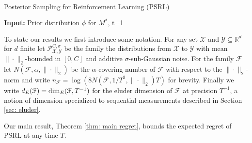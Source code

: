 \documentclass{article}
\newcommand{\Real}{\mathds{R}}
\newcommand{\Xc}{\mathcal{X}}
\newcommand{\Yc}{\mathcal{Y}}
\newcommand{\Pc}{\mathcal{P}}
\newcommand{\Fc}{\mathcal{F}}
\begin{document}
\begin{algorithm}[H]
\caption{\protect\\ Posterior Sampling for Reinforcement Learning (PSRL)}
\label{alg: PS}

\begin{algorithmic}[1]
    \State \textbf{Input: }Prior distribution $\phi$ for $M^*$, t=1
	    \EndFor
	\EndFor
\end{algorithmic}
\end{algorithm}

To state our results we first introduce some notation.
For any set $\Xc$ and $\Yc \subseteq \Real^d$ for $d$ finite let $\Pc^{C,\sigma}_{\Xc,\Yc}$ be the family the distributions from $\Xc$ to $\Yc$ with mean $\|\cdot\|_2$-bounded in $[0,C]$ and additive $\sigma$-sub-Gaussian noise.
For the family $\Fc$ let $N(\Fc,\alpha,\|\cdot\|_2)$ be the $\alpha$-covering number of $\Fc$ with respect to the $\|\cdot\|_2$-norm and write $n_\Fc = \log(8 N(\Fc,1/T^2,\|\cdot\|_2)T)$ for brevity.
Finally we  write $d_E(\Fc) = {\rm dim}_E(\Fc,T^{-1})$ for the eluder dimension of $\Fc$ at precision $T^{-1}$, a notion of dimension specialized to sequential measurements described in Section \ref{sec: eluder}.

Our main result, Theorem \ref{thm: main regret}, bounds the expected regret of PSRL at any time $T$.
\end{document}
